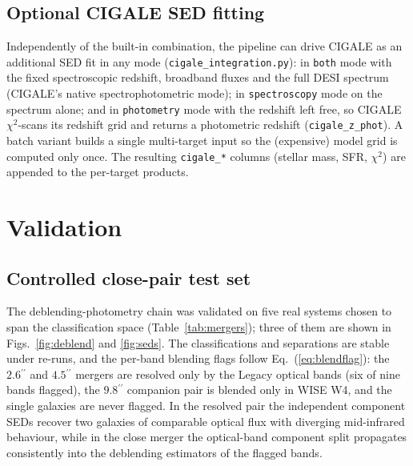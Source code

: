 \documentclass{aa}
\newcommand{\arcsecond}{\ensuremath{^{\prime\prime}}}
\begin{document}
\subsection{Optional CIGALE SED fitting}

Independently of the built-in combination, the pipeline can drive CIGALE
\citep{boquien2019} as an additional SED fit in any mode
(\texttt{cigale\_integration.py}): in \texttt{both} mode with the fixed
spectroscopic redshift, broadband fluxes and the full DESI spectrum
(CIGALE's native spectrophotometric mode); in \texttt{spectroscopy} mode
on the spectrum alone; and in \texttt{photometry} mode with the redshift
left free, so CIGALE $\chi^2$-scans its redshift grid and returns a
photometric redshift (\texttt{cigale\_z\_phot}). A batch variant builds a
single multi-target input so the (expensive) model grid is computed only
once. The resulting \texttt{cigale\_*} columns (stellar mass, SFR,
$\chi^2$) are appended to the per-target products.

\section{Validation}
\label{sec:validation}

\subsection{Controlled close-pair test set}
\label{sec:mergers}

The deblending-photometry chain was validated on five real systems chosen
to span the classification space (Table~\ref{tab:mergers}); three of them
are shown in Figs.~\ref{fig:deblend} and \ref{fig:seds}. The
classifications and separations are stable under re-runs, and the
per-band blending flags follow Eq.~(\ref{eq:blendflag}): the
$2.6\arcsecond$ and $4.5\arcsecond$ mergers are resolved only by the
Legacy optical bands (six of nine bands flagged), the
$9.8\arcsecond$ companion pair is blended only in WISE W4, and the single
galaxies are never flagged. In the resolved pair the independent
component SEDs recover two galaxies of comparable optical flux with
diverging mid-infrared behaviour, while in the close merger the
optical-band component split propagates consistently into the deblending
estimators of the flagged bands.
\end{document}
